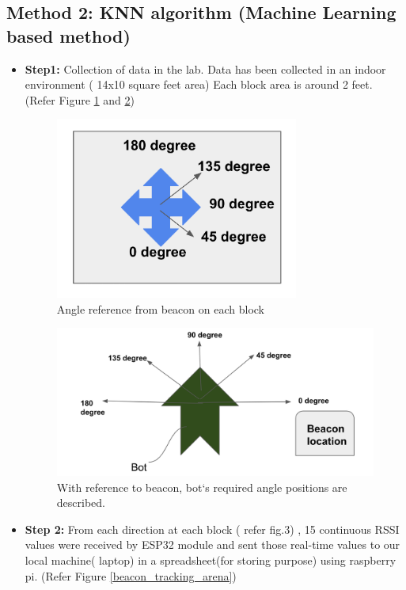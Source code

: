 \newpage
\subsection{Method 2: KNN algorithm (Machine Learning based method)}

\begin{itemize}
    \item \textbf{Step1:} Collection of data in the lab. Data has been collected in an indoor environment ( 14x10 square feet area) Each block area is around 2 feet. (Refer Figure \ref{angle_ref_beacon} and \ref{bot_angle_pos_beacon})
    
    \begin{figure}[h!]
    \centering
    \includegraphics[width=8cm]{./Figures/angle_ref_beacon.png}    \caption{Angle reference from beacon on each block}
    \label{angle_ref_beacon}
    \end{figure}
    
    \begin{figure}[h!]
    \centering
    \includegraphics[width=12cm]{./Figures/bot_angle_pos_beacon.png}
    \caption{With reference to beacon, bot`s required angle positions are described.}
    \label{bot_angle_pos_beacon}
    \end{figure}
    
    \item \textbf{Step 2:} From each direction at each block ( refer fig.3) , 15 continuous RSSI values were received by ESP32 module and sent those real-time values to our local machine( laptop) in a spreadsheet(for storing purpose)  using raspberry pi. (Refer Figure \ref{beacon_tracking_arena})
    

\end{itemize}
